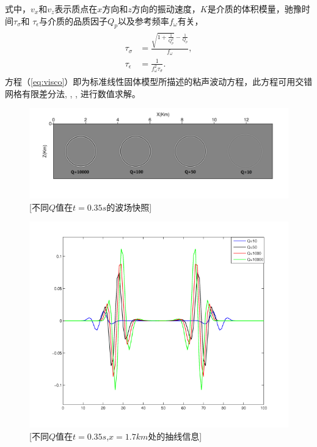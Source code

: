 式中，$v_x$和$v_z$表示质点在$x$方向和$z$方向的振动速度，$K$是介质的体积模量，驰豫时间$\tau_\sigma$和
$\tau_\epsilon$与介质的品质因子$Q_p$以及参考频率$f_\omega$有关，
\begin{eqnarray}
    \begin{aligned}
        \tau_\sigma &= \frac{\sqrt{1+\frac{1}{Q_p^2}}-\frac{1}{Q_p}}{f_\omega},\\
        \tau_\epsilon &= \frac{1}{f_\omega^2\tau_\sigma}.
    \end{aligned}
\end{eqnarray}
方程（\ref{eq:visco}）即为标准线性固体模型所描述的粘声波动方程，此方程可用交错网格有限差分法, ,
, 进行数值求解。

\begin{figure}[!htbp]
	    \centering
		\includegraphics[width=1.0\linewidth]{figure/wave_sls1}
		[不同$Q$值在$t=0.35s$的波场快照]
		\label{fig:wave_sls1}
\end{figure}
\begin{figure}[!htbp]
	    \centering
		\includegraphics[width=0.5\linewidth]{figure/wave_sls3}
		[不同$Q$值在$t=0.35s$,$x=1.7km$处的抽线信息]
		\label{fig:wave_sls3}
\end{figure}
